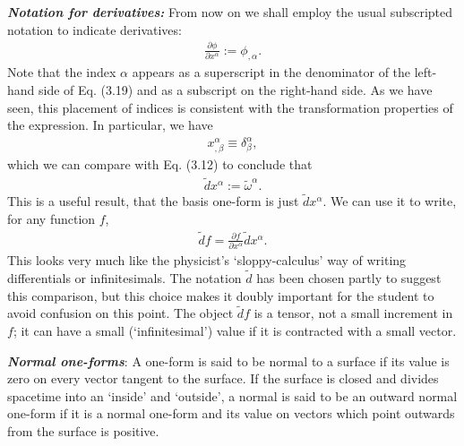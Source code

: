 \documentclass[12pt]{book}
\begin{document}
    \textit{\textbf{Notation for derivatives:}}
    From now on we shall employ the usual subscripted notation to indicate derivatives:
    \begin{align}
    \frac{\partial \phi}{\partial x^\alpha} := \phi_{,\alpha}. \tag{3.19}
    \end{align}
    Note that the index \(\alpha\) appears as a superscript in the denominator of the left-hand side of Eq. (3.19) and as a subscript on the right-hand side. As we have seen, this placement of indices is consistent with the transformation properties of the expression. In particular, we have
    \begin{align}
    x^\alpha_{,\beta} \equiv \delta^\alpha_\beta,
    \end{align}
    which we can compare with Eq. (3.12) to conclude that
    \begin{align}
    \tilde{d}x^\alpha := \tilde{\omega}^\alpha. \tag{3.20}
    \end{align}
    This is a useful result, that the basis one-form is just \(\tilde{d}x^\alpha\). We can use it to write, for any function \(f\),
    \begin{align}
    \tilde{d}f = \frac{\partial f}{\partial x^\alpha} \tilde{d}x^\alpha.
    \end{align}
    This looks very much like the physicist’s ‘sloppy-calculus’ way of writing differentials or infinitesimals. The notation \(\tilde{d}\) has been chosen partly to suggest this comparison, but this choice makes it doubly important for the student to avoid confusion on this point. The object \(\tilde{d}f\) is a tensor, not a small increment in \(f\); it can have a small (‘infinitesimal’) value if it is contracted with a small vector.

    \textit{\textbf{Normal one-forms}}: A one-form is said to be normal to a surface if its value is zero on every vector tangent to the surface. If the surface is closed and divides spacetime into an ‘inside’ and ‘outside’, a normal is said to be an outward normal one-form if it is a normal one-form and its value on vectors which point outwards from the surface is positive.
\end{document}
